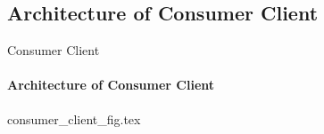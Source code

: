 \subsection{Architecture of Consumer Client}

\begin{frame}{Consumer Client}
    \framesubtitle{Architecture of Consumer Client}
    {consumer_client_fig.tex}
\end{frame}

